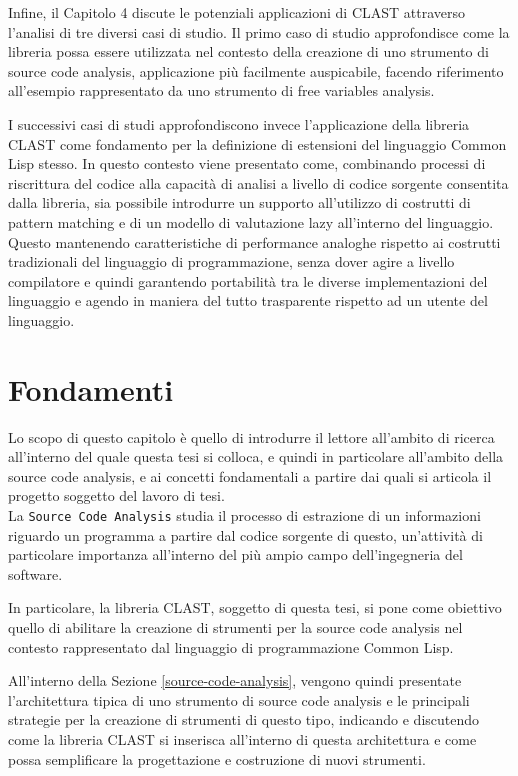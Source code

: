 \documentclass{book}
\begin{document}
Infine, il Capitolo 4 discute le potenziali applicazioni di CLAST attraverso
l’analisi di tre diversi casi di studio. Il primo caso di studio approfondisce
come la libreria possa essere utilizzata nel contesto della creazione di uno
strumento di source code analysis, applicazione più facilmente auspicabile,
facendo riferimento all’esempio rappresentato da uno strumento di free variables
analysis.

I successivi casi di studi approfondiscono invece l’applicazione della libreria
CLAST come fondamento per la definizione di estensioni del linguaggio Common
Lisp stesso. In questo contesto viene presentato come, combinando processi di
riscrittura del codice alla capacità di analisi a livello di codice sorgente
consentita dalla libreria, sia possibile introdurre un supporto all’utilizzo di
costrutti di pattern matching e di un modello di valutazione lazy all’interno
del linguaggio. Questo mantenendo caratteristiche di performance analoghe
rispetto ai costrutti tradizionali del linguaggio di programmazione, senza dover
agire a livello compilatore e quindi garantendo portabilità tra le diverse
implementazioni del linguaggio e agendo in maniera del tutto trasparente
rispetto ad un utente del linguaggio.

\begingroup
\let\clearpage\relax

\chapter{Fondamenti}

Lo scopo di questo capitolo è quello di introdurre il lettore all’ambito di
ricerca all’interno del quale questa tesi si colloca, e quindi in particolare
all’ambito della source code analysis, e ai concetti fondamentali a partire dai
quali si articola il progetto soggetto del lavoro di tesi.\\

La \texttt{Source Code Analysis} studia il processo di estrazione di un
informazioni riguardo un programma a partire dal codice sorgente di questo,
un’attività di particolare importanza all'interno del più ampio campo
dell'ingegneria del software.

In particolare, la libreria CLAST, soggetto di questa tesi, si pone come
obiettivo quello di abilitare la creazione di strumenti per la source code
analysis nel contesto rappresentato dal linguaggio di programmazione Common
Lisp.

All'interno della Sezione \ref{source-code-analysis}, vengono quindi presentate
l'architettura tipica di uno strumento di source code analysis e le principali
strategie per la creazione di strumenti di questo tipo, indicando e discutendo
come la libreria CLAST si inserisca all'interno di questa architettura e come
possa semplificare la progettazione e costruzione di nuovi strumenti.\\
\end{document}
